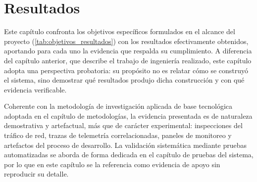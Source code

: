 \section{Resultados}

Este capítulo confronta los objetivos específicos formulados en el alcance del proyecto (\autoref{tab:objetivos_resultados}) con los resultados efectivamente obtenidos, aportando para cada uno la evidencia que respalda su cumplimiento. A diferencia del capítulo anterior, que describe el trabajo de ingeniería realizado, este capítulo adopta una perspectiva probatoria: su propósito no es relatar cómo se construyó el sistema, sino demostrar qué resultados produjo dicha construcción y con qué evidencia verificable.

Coherente con la metodología de investigación aplicada de base tecnológica adoptada en el capítulo de metodologías, la evidencia presentada es de naturaleza demostrativa y artefactual, más que de carácter experimental: inspecciones del tráfico de red, trazas de telemetría correlacionadas, paneles de monitoreo y artefactos del proceso de desarrollo. La validación sistemática mediante pruebas automatizadas se aborda de forma dedicada en el capítulo de pruebas del sistema, por lo que en este capítulo se la referencia como evidencia de apoyo sin reproducir su detalle.







